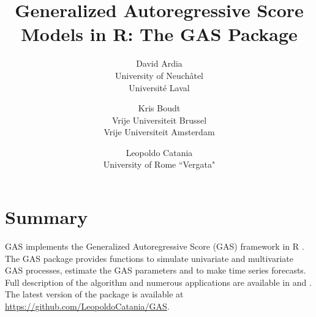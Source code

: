 \documentclass[11pt]{article}
\begin{document}
\title{Generalized Autoregressive Score Models in R: The GAS Package}
\author{David Ardia\\
University of Neuch\^atel\\
Universit\'e Laval\and
Kris Boudt\\
Vrije Universiteit Brussel\\
Vrije Universiteit Amsterdam\and
Leopoldo Catania\\
University of Rome ``Vergata"}
	
\maketitle

\section*{Summary}

GAS implements the
Generalized Autoregressive Score (GAS) framework in R \citep{R}. The GAS package
provides functions to simulate univariate and multivariate GAS processes, estimate the
GAS parameters and to make time series forecasts. Full description of the algorithm and numerous applications are available in \citet{ArdiaEtAl2016a} and \citet{ArdiaEtAl2016b}. The latest version of the package is available at \url{https://github.com/LeopoldoCatania/GAS}.



	
\end{document}
